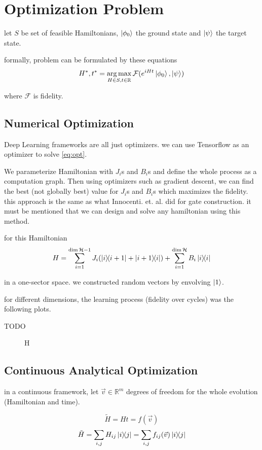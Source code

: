 \documentclass{article}
\DeclareMathOperator*{\argmax}{arg\,max}
\begin{document}
\section{Optimization Problem}
let $S$ be set of feasible Hamiltonians, $\ket{\phi_0}$ the ground state and $\ket{\psi}$ the target state.

formally, problem can be formulated by these equations
\begin{equation} 
\label{eq:opt}
H^*, t^* = \argmax_{H \in S, t \in \mathbb{R}} \mathcal{F}(e^{iHt} \ket{\phi_0}, \ket{\psi})
\end{equation}

where $\mathcal{F}$ is fidelity.

\subsection{Numerical Optimization}
Deep Learning frameworks are all just optimizers. we can use Tensorflow as an optimizer to solve \ref{eq:opt}.

We parameterize Hamiltonian with $J_i$s and $B_i$s and define the whole process as a computation graph. Then using optimizers such as gradient descent, we can find the best (not globally best) value for $J_i$s and $B_i$s which maximizes the fidelity. this approach is the same as what Innocenti. et. al. did for gate construction. it must be mentioned that we can design and solve any hamiltonian using this method.

for this Hamiltonian
\[ H = \sum_{i=1}^{\dim \mathcal{H} - 1} J_i (\dyad{i}{i + 1} + \dyad{i + 1}{i})  + \sum_{i=1}^{\dim \mathcal{H}} B_i \dyad{i}{i} \]

in a one-sector space. we constructed random vectors by envolving $\ket{1}$.

for different dimensions, the learning process (fidelity over cycles) was the following plots.

TODO
\begin{figure}{H}
\end{figure}

\subsection{Continuous Analytical Optimization}
in a continuous framework, let $\vec{v} \in \mathbb{R}^m$ degrees of freedom for the whole evolution (Hamiltonian and time).

\[ \tilde{H} = Ht = f(\vec{v}) \]
\[ \tilde{H} = \sum_{i, j} H_{ij} \dyad{i}{j} = \sum_{i, j} f_{ij}(\vec{v}) \dyad{i}{j} \]
\end{document}
